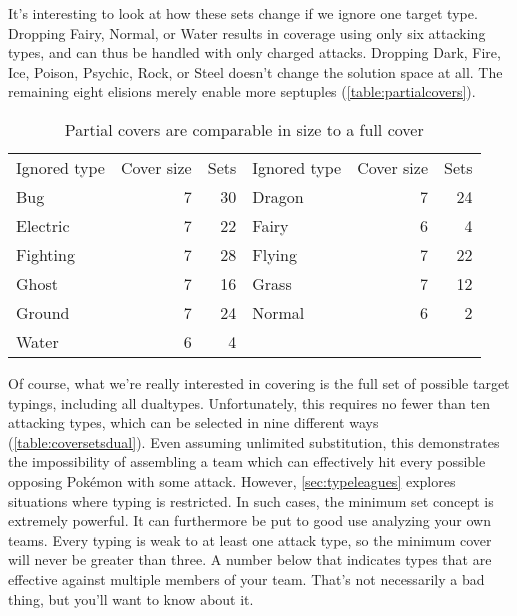 It's interesting to look at how these sets change if we ignore one target type.
Dropping Fairy, Normal, or Water results in coverage using only six attacking types,
  and can thus be handled with only charged attacks.
Dropping Dark, Fire, Ice, Poison, Psychic, Rock, or Steel doesn't change the solution space at all.
The remaining eight elisions merely enable more septuples (\autoref{table:partialcovers}).
\begin{table}
\centering
  \begin{tabular}{lrr|lrr}
    Ignored type & Cover size & Sets & Ignored type & Cover size & Sets\\
    \Midrule
    Bug & 7 & 30 & Dragon & 7 & 24\\
    Electric & 7 & 22 & Fairy & 6 & 4\\
    Fighting & 7 & 28 & Flying & 7 & 22\\
    Ghost & 7 & 16 & Grass & 7 & 12\\
    Ground & 7 & 24 & Normal & 6 & 2\\
    Water & 6 & 4 & & & \\
  \end{tabular}
  \caption{Partial covers are comparable in size to a full cover\label{table:partialcovers}}
\end{table}

Of course, what we're really interested in covering is the full set
  of possible target typings, including all dualtypes.
Unfortunately, this requires no fewer than ten attacking types,
  which can be selected in nine different ways (\autoref{table:coversetsdual}).
Even assuming unlimited substitution, this demonstrates the
  impossibility of assembling a team which can effectively
  hit every possible opposing Pokémon with some attack.
However, \autoref{sec:typeleagues} explores situations where typing is restricted.
In such cases, the minimum set concept is extremely powerful.
It can furthermore be put to good use analyzing your own teams.
Every typing is weak to at least one attack type, so the minimum
 cover will never be greater than three.
A number below that indicates types that are effective against
 multiple members of your team.
That's not necessarily a bad thing, but you'll want to know about it.


